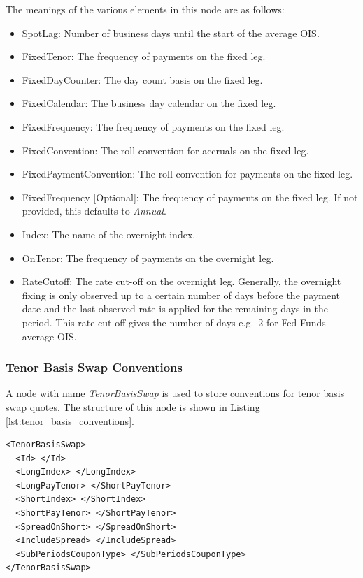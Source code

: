The meanings of the various elements in this node are as follows:
\begin{itemize}
\item SpotLag: Number of business days until the start of the average OIS.
\item FixedTenor: The frequency of payments on the fixed leg.
\item FixedDayCounter: The day count basis on the fixed leg.
\item FixedCalendar: The business day calendar on the fixed leg.
\item FixedFrequency: The frequency of payments on the fixed leg.
\item FixedConvention: The roll convention for accruals on the fixed leg.
\item FixedPaymentConvention: The roll convention for payments on the fixed leg.
\item FixedFrequency [Optional]: The frequency of payments on the fixed leg. If not provided, this defaults to \emph{Annual}.
\item Index: The name of the overnight index.
\item OnTenor: The frequency of payments on the overnight leg.
\item RateCutoff: The rate cut-off on the overnight leg. Generally, the overnight fixing is only observed up to a
certain number of days before the payment date and the last observed rate is applied for the remaining days in the
period. This rate cut-off gives the number of days e.g.\ 2 for Fed Funds average OIS.
\end{itemize}

\subsubsection{Tenor Basis Swap Conventions}
A node with name \emph{TenorBasisSwap} is used to store conventions for tenor basis swap quotes. The structure of this 
node is shown in Listing \ref{lst:tenor_basis_conventions}.

\begin{listing}[H]
\begin{verbatim}
<TenorBasisSwap>
  <Id> </Id>
  <LongIndex> </LongIndex>
  <LongPayTenor> </ShortPayTenor>
  <ShortIndex> </ShortIndex>
  <ShortPayTenor> </ShortPayTenor>
  <SpreadOnShort> </SpreadOnShort>
  <IncludeSpread> </IncludeSpread>
  <SubPeriodsCouponType> </SubPeriodsCouponType>
</TenorBasisSwap>
\end{verbatim}
\caption{Tenor basis swap conventions}
\label{lst:tenor_basis_conventions}
\end{listing}


